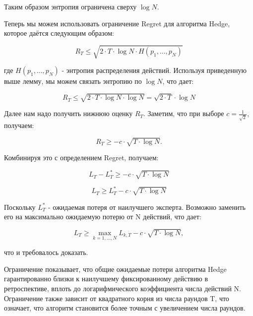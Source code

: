 \documentclass[a4paper,14pt]{extarticle}
\begin{document}
Таким образом энтропия ограничена сверху $\log N$.

Теперь мы можем использовать ограничение Regret для алгоритма Hedge, которое даётся следующим образом:

\begin{equation}R_T \leq \sqrt{2 \cdot T \cdot \log N \cdot H(p_1, \dots, p_N)}\end{equation}

где $H(p_1, \dots, p_N)$ - энтропия распределения действий. Используя приведенную выше лемму, мы можем связать энтропию по $\log N$, что дает:

\begin{equation}R_T \leq \sqrt{2 \cdot T \cdot \log N \cdot \log N} = \sqrt{2 \cdot T} \cdot \log N\end{equation}

Далее нам надо получить нижнюю оценку $R_T$. Заметим, что при выборе $c = \frac{1}{\sqrt{2}}$, получаем:

\begin{equation}R_T \geq -c \cdot \sqrt{T \cdot \log N}.\end{equation}

Комбинируя это с определением Regret, получаем:

\begin{equation}L_T - L^*_T \geq -c \cdot \sqrt{T \cdot \log N}\end{equation}

\begin{equation}L_T \geq L^*_T - c \cdot \sqrt{T \cdot \log N}\end{equation}

Поскольку $L^*_T$ - ожидаемая потеря от наилучшего эксперта. Возможно заменить его на максимально ожидаемую потерю от N действий, что дает:

\begin{equation}L_T \geq \max\limits_{k=1,\dots,N} L_{k,T} - c \cdot\sqrt{T \cdot \log N},\end{equation}

что и требовалось доказать.

Ограничение показывает, что общие ожидаемые потери алгоритма Hedge гарантированно близки к наилучшему фиксированному действию в ретроспективе, вплоть до логарифмического коэффициента числа действий N. Ограничение также зависит от квадратного корня из числа раундов T, что означает, что алгоритм становится более точным с увеличением числа раундов.
\end{document}
